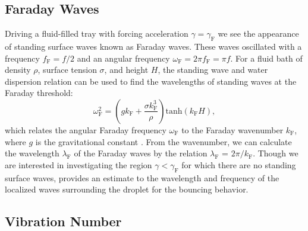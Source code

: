 \subsection{Faraday Waves}
Driving a fluid-filled tray with forcing acceleration $\gamma = \gamma_\mathrm{F}$ we see the appearance of standing surface waves known as Faraday waves. These waves oscillated with a  frequency $f_\mathrm{F} = f/2$ and an angular frequency $\omega_\mathrm{F} = 2\pi f_\mathrm{F}=\pi f$. For a fluid bath of density $\rho$, surface tension $\sigma$, and height $H$, the standing wave and water dispersion relation can be used to find the wavelengths of standing waves at the Faraday threshold:
\begin{equation} \label{dispersion}
\omega_\mathrm{F}^2 = \left(gk_\mathrm{F}+\frac{\sigma k_\mathrm{F}^3}{\rho}\right)\mathrm{tanh}(k_\mathrm{F}H),
\end{equation} 
which relates the angular Faraday frequency $\omega_\mathrm{F}$ to the Faraday wavenumber $k_\mathrm{F}$, where $g$ is the gravitational constant . From the wavenumber, we can calculate the wavelength $\lambda_\mathrm{F}$ of the Faraday waves by the relation $\lambda_\mathrm{F}$ = $2\pi/k_\mathrm{F}$. Though we are interested in investigating the region $\gamma < \gamma_\mathrm{F}$ for which there are no standing surface waves,  provides an estimate to the wavelength and frequency of the localized waves surrounding the droplet for the bouncing behavior. 


\subsection{Vibration Number}


